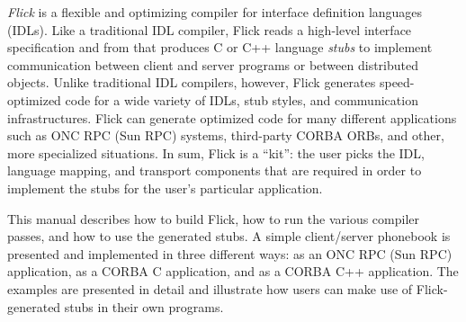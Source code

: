 

\emph{Flick} is a flexible and optimizing compiler for interface definition
languages (IDLs).  Like a traditional IDL compiler, Flick reads a high-level
interface specification and from that produces C or C++ language \emph{stubs}
to implement communication between client and server programs or between
distributed objects.  Unlike traditional IDL compilers, however, Flick
generates speed-optimized code for a wide variety of IDLs, stub styles, and
communication infrastructures.  Flick can generate optimized code for many
different applications such as ONC RPC (Sun RPC) systems, third-party CORBA
ORBs, and other, more specialized situations.  In sum, Flick is a ``kit'': the
user picks the IDL, language mapping, and transport components that are
required in order to implement the stubs for the user's particular application.

This manual describes how to build Flick, how to run the various compiler
passes, and how to use the generated stubs.  A simple client/server phonebook
is presented and implemented in three different ways: as an ONC RPC (Sun RPC)
application, as a CORBA C application, and as a CORBA C++ application.  The
examples are presented in detail and illustrate how users can make use of
Flick-generated stubs in their own programs.




